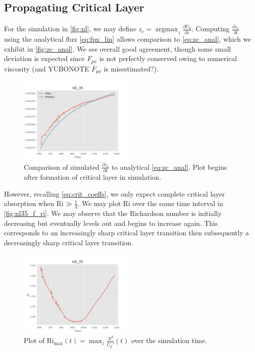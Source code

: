 \documentclass[twocolumn,
        usenames, %
        dvipsnames %
    ]{revtex4-1}%
\newcommand*{\pd}[2]{\frac{\partial#1}{\partial#2}}
\DeclareMathOperator*{\argmax}{argmax}
\begin{document}
\subsection{Propagating Critical Layer}

For the simulation in \autoref{fig:nl}, we may define $z_c = \argmax_z
\pd{\bar{U}_0}{z}$. Computing $\pd{z_c}{t}$ using the analytical flux
\autoref{eq:fpx_lin} allows comparison to \autoref{eq:zc_anal}, which we exhibit
in \autoref{fig:zc_anal}. We see overall good agreement, though some small
deviation is expected since $F_{px}$ is not perfectly conserved owing to
numerical viscosity (and YUBONOTE $F_{px}$ is misestimated?).
\begin{figure}[h]
    \centering
    \includegraphics[width=0.5\textwidth]{plots/nl35_front_v.png}
    \caption{Comparison of simulated $\pd{z_c}{t}$ to analytical
    \autoref{eq:zc_anal}. Plot begins after formation of critical layer in
    simulation.}\label{fig:zc_anal}
\end{figure}

However, recalling \autoref{eq:crit_coeffs}, we only expect complete critical
layer absorption when $\mathrm{Ri} \gg \frac{1}{4}$. We may plot $\mathrm{Ri}$
over the same time interval in \autoref{fig:nl35_f_ri}. We may observe that the
Richardson number is initially decreasing but eventually levels out and
begins to increase again. This corresponds to an increasingly sharp critical
layer transition then subsequently a decreasingly sharp critical layer
transition.
\begin{figure}[h]
    \centering
    \includegraphics[width=0.5\textwidth]{plots/nl35_f_ri.png}
    \caption{Plot of $\mathrm{Ri}_{\max}(t) = \max_z
    \frac{N^2}{\bar{U}_0'}(t)$ over the simulation time.}\label{fig:nl35_f_ri}
\end{figure}
\end{document}
